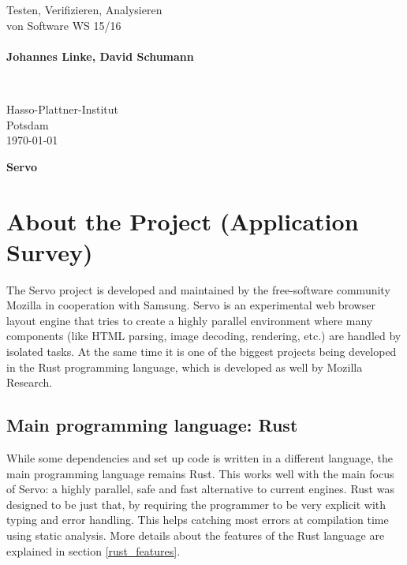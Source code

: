 \documentclass{scrartcl}
\begin{document}
\pagestyle{plain}


\noindent
\begin{minipage}{0.66\textwidth}
Testen, Verifizieren, Analysieren\\
von Software WS 15/16\\
~\\
\textbf{Johannes Linke, David Schumann}
\end{minipage}
~
\begin{minipage}{0.30\textwidth}
Hasso-Plattner-Institut\\
Potsdam\\
\today
\end{minipage}


\begin{center}
 \huge \bf Servo
\end{center}

\section{About the Project (Application Survey)}

The Servo project is developed and maintained by the free-software community Mozilla in cooperation with Samsung. Servo is an experimental web browser layout engine that tries to create a highly parallel environment where many components (like HTML parsing, image decoding, rendering, etc.) are handled by isolated tasks. At the same time it is one of the biggest projects being developed in the Rust programming language, which is developed as well by Mozilla Research.

\subsection*{Main programming language: Rust}
While some dependencies and set up code is written in a different language, the main programming language remains Rust. This works well with the main focus of Servo: a highly parallel, safe and fast alternative to current engines. Rust was designed to be just that, by requiring the programmer to be very explicit with typing and error handling. This helps catching most errors at compilation time using static analysis. More details about the features of the Rust language are explained in section \ref{rust_features}.
\end{document}
